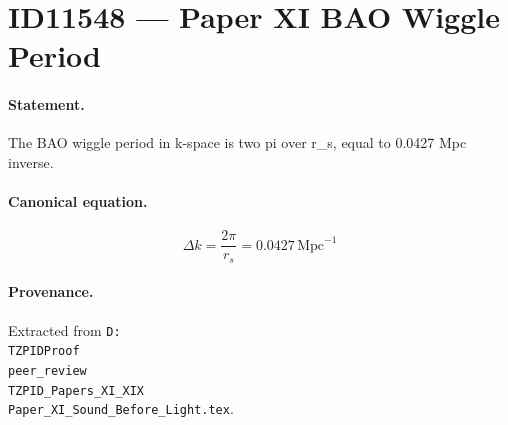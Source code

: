 \section*{ID11548 --- Paper XI BAO Wiggle Period}

\paragraph{Statement.}
The BAO wiggle period in k-space is two pi over r_s, equal to 0.0427 Mpc inverse.

\paragraph{Canonical equation.}
\[
\Delta k=\frac{2\pi}{r_s}=0.0427\,\mathrm{Mpc}^{-1}
\]

\paragraph{Provenance.}
Extracted from \texttt{D:\\TZPIDProof\\peer\_review\\TZPID\_Papers\_XI\_XIX\\Paper\_XI\_Sound\_Before\_Light.tex}.
